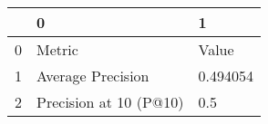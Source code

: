 \begin{tabular}{lll}
\toprule
{} &                       0 &         1 \\
\midrule
0 &                  Metric &     Value \\
1 &       Average Precision &  0.494054 \\
2 &  Precision at 10 (P@10) &       0.5 \\
\bottomrule
\end{tabular}
